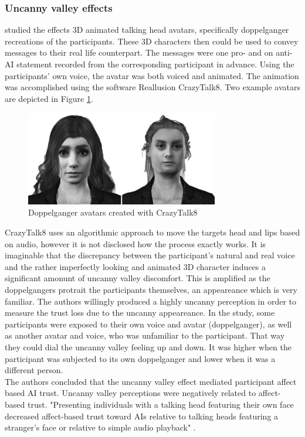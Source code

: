 \documentclass[
  a4paper,  %
  twoside,  %
  bibliography=totoc,
  headsepline,
  cleardoublepage=empty,
  parskip=half,
  draft=false
]{scrbook}
\begin{document}
\subsubsection*{Uncanny valley effects}
 studied the effects 3D animated talking head avatars, specifically doppelganger recreations of the participants. These 3D characters then could be used to convey messages to their real life counterpart. The messages were one pro- and on anti-AI statement recorded from the corresponding participant in advance. Using the participants' own voice, the avatar was both voiced and animated. The animation was accomplished using the software Reallusion CrazyTalk8. Two example avatars are depicted in Figure \ref{fig:uncanny-avatars}.
\begin{figure}[h]
  \centering
  \includegraphics[width=0.75\textwidth]{./graphics/images/uncanny-avatars.png}
  \caption{Doppelganger avatars created with CrazyTalk8 \cite{weismanFaceUncannyEffects2021}}
  \label{fig:uncanny-avatars}
\end{figure}
CrazyTalk8 uses an algorithmic approach to move the targets head and lips based on audio, however it is not disclosed how the process exactly works. It is imaginable that the discrepancy between the participant's natural and real voice and the rather imperfectly looking and animated 3D character induces a significant amonunt of uncanny valley discomfort. This is amplified as the doppelgangers protrait the participants themselves, an appeareance which is very familiar. The authors willingly produced a highly uncanny perception in order to measure the trust loss due to the uncanny appeareance. In the study, some participants were exposed to their own voice and avatar (doppelganger), as well as another avatar and voice, who was unfamiliar to the participant. That way they could dial the uncanny valley feeling up and down. It was higher when the participant was subjected to its own doppelganger and lower when it was a different person.\\
The authors concluded that the uncanny valley effect mediated participant affect based AI trust. Uncanny valley perceptions were negatively related to affect-based trust. "Presenting individuals with a talking head featuring their own face decreased affect-based trust toward AIs relative to talking heads featuring a stranger's face or relative to simple audio playback" \cite{weismanFaceUncannyEffects2021}. \\
\end{document}
